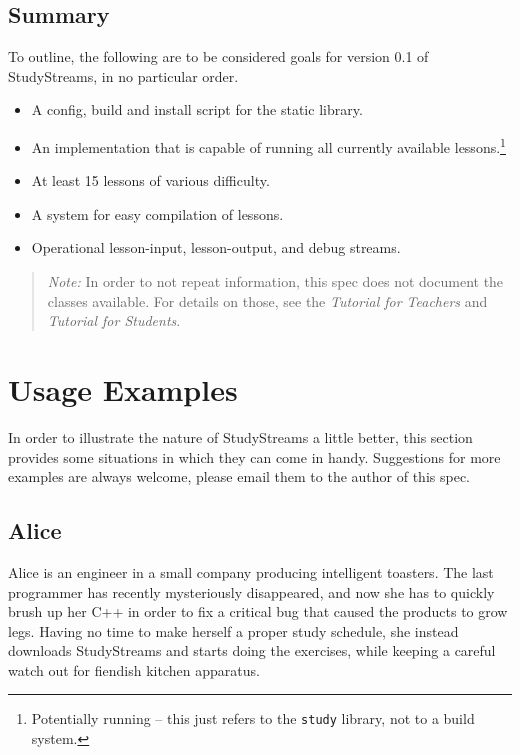 \documentclass[12pt,a4paper]{report}
\begin{document}
		\section{Summary}
			To outline, the following are to be considered goals for version
			0.1 of StudyStreams, in no particular order.
			\begin{itemize}
				\item A config, build and install script for the static library.
				\item An implementation that is capable of running all currently
					available lessons.\footnote{Potentially running -- this just
					refers to the \texttt{study} library, not to a build system.}
				\item At least 15 lessons of various difficulty.
				\item A system for easy compilation of lessons.
				\item Operational lesson-input, lesson-output, and debug streams.
			\end{itemize}

		\begin{quote}
			\emph{Note:} In order to not repeat information, this spec does not
			document the classes available.  For details on those, see the
			\textit{Tutorial for Teachers} and \textit{Tutorial for Students}.
		\end{quote}

	\chapter{Usage Examples}
		In order to illustrate the nature of StudyStreams a little better,
		this section provides some situations in which they can come in handy.
		Suggestions for more examples are always welcome, please email them to
		the author of this spec.

		\section{Alice}
			Alice is an engineer in a small company producing intelligent
			toasters.  The last programmer has recently mysteriously
			disappeared, and now she has to quickly brush up her C++ in
			order to fix a critical bug that caused the products to grow
			legs.  Having no time to make herself a proper study schedule,
			she instead downloads StudyStreams and starts doing the exercises,
			while keeping a careful watch out for fiendish kitchen apparatus.
\end{document}
